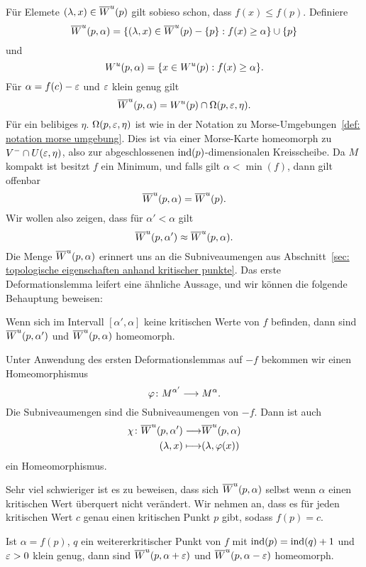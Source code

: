 \begin{bigproof}
    Für Elemete $(\lambda, x) \in { \overline{W}^u } (p)$ gilt sobieso schon, dass $f(x) \leq f(p)$. Definiere
    \[ { \overline{W}^u } (p, \alpha) = 
        \{ (\lambda, x) \in { \overline{W}^u } (p) - \{ p \} : f(x) \geq \alpha \}  \cup \{ p \} \]
    und 
    \[ { W^u } (p, \alpha) = \{ x \in { W^u } (p) : f(x) \geq \alpha \} . \]
    Für $\alpha = f(c) - \varepsilon$ und $\varepsilon$ klein genug gilt 
    \[ { \overline{W}^u } (p, \alpha) = { W^u } (p) \cap \Omega (p, \varepsilon, \eta) . \]
    Für ein belibiges $\eta$. $\Omega (p, \varepsilon, \eta)$ ist wie in der Notation zu 
    Morse-Umgebungen~\ref{def: notation morse umgebung}. Dies ist via einer Morse-Karte homeomorph 
    zu $V^- \cap U(\varepsilon, \eta)$, also zur abgeschlossenen ${ \operatorname{ind} } (p)$-dimensionalen Kreisscheibe.
    Da $M$ kompakt ist besitzt $f$ ein Minimum, und falls gilt $\alpha < \min (f)$, dann gilt 
    offenbar
    \[ { \overline{W}^u } (p, \alpha) = { \overline{W}^u } (p) . \]
    Wir wollen also zeigen, dass für $\alpha' < \alpha$ gilt
    \[ { \overline{W}^u } (p, \alpha') \approx { \overline{W}^u } (p, \alpha) . \]
    Die Menge ${ \overline{W}^u } (p, \alpha)$ erinnert uns an die Subniveaumengen aus 
    Abschnitt~\ref{sec: topologische eigenschaften anhand kritischer punkte}. Das erste 
    Deformationslemma leifert eine ähnliche Aussage, und wir können die folgende Behauptung 
    beweisen:

    \begin{claim}
        Wenn sich im Intervall $[\alpha', \alpha]$ keine kritischen Werte von $f$
        befinden, dann sind ${ \overline{W}^u } (p, \alpha')$ und ${ \overline{W}^u } (p, \alpha)$ homeomorph.
    \end{claim}

    \begin{smallproof}
        Unter Anwendung des ersten Deformationslemmas auf $-f$ bekommen wir einen Homeomorphismus
        \[ \varphi \colon M^{\alpha'} \longrightarrow M^{\alpha} . \]
        Die Subniveaumengen sind die Subniveaumengen von $-f$. Dann ist auch 
        \begin{align*}
            \chi \colon { \overline{W}^u } (p, \alpha') \longrightarrow & { \overline{W}^u } (p, \alpha) \\
            (\lambda, x) \longmapsto & (\lambda, \varphi(x))
        \end{align*}
        ein Homeomorphismus.
    \end{smallproof}

    Sehr viel schwieriger ist es zu beweisen, dass sich ${ \overline{W}^u } (p, \alpha)$ selbst wenn $\alpha$
    einen kritischen Wert überquert nicht verändert. Wir nehmen an, dass es für jeden kritischen Wert
    $c$ genau einen kritischen Punkt $p$ gibt, sodass $f (p) = c$. 

    \begin{claim}
        Ist $\alpha = f(p)$, $q$ ein weitererkritischer Punkt von $f$ mit 
        ${ \operatorname{ind} } (p) = { \operatorname{ind} } (q) + 1$ und $\varepsilon > 0$ klein genug, dann sind 
        ${ \overline{W}^u } (p, \alpha + \varepsilon)$ und ${ \overline{W}^u } (p, \alpha - \varepsilon)$ homeomorph.
    \end{claim}

\end{bigproof}


